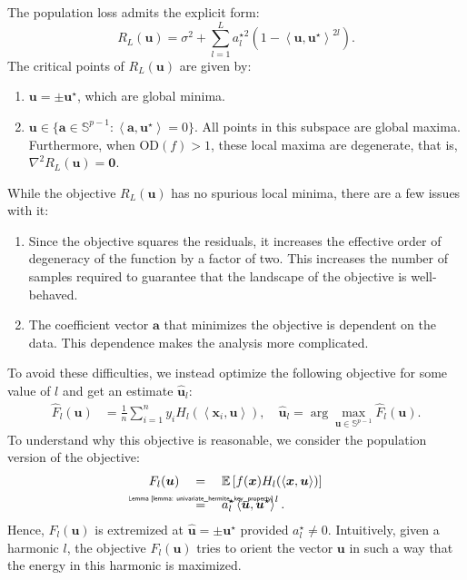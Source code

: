 \documentclass[final,12pt]{colt2018} %
\newcommand{\E}{\mathbb{E}}
\newcommand{\sd}[1]{\text{OD}(#1)}
\newcommand{\unitsphere}[1]{\mathbb{S}^{#1}}
\newcommand{\explain}[2]{\mathrel{\overset{\makebox[0pt]{\mbox{\normalfont\tiny\sffamily #1}}}{#2}}}
\renewcommand\v[1]{{\ensuremath{\boldsymbol{#1}}}}
\newcommand\ip[1]{\left\langle #1 \right\rangle}
\begin{document}
\begin{theorem}
\label{theorem: landscape_population_loss} The population loss admits the explicit form: 
$$R_L(\v u)  = \sigma^2 + \sum_{l=1}^L {a_l^\star}^2 (1-\ip{\v u, \v u^\star}^{2l}). $$
The critical points of $ R_L(\v u)$ are given by:
\begin{enumerate}
    \item $\v u = \pm \v u^\star$, which are global minima.
    \item $\v u \in \{ \v a \in \unitsphere{p-1}: \ip{\v a, \v u^\star} = 0\}$. All points in this subspace are global maxima. Furthermore, when $\sd{f}>1$, these local maxima are degenerate, that is, $\nabla^2 R_L(\v u) = \v 0$.
\end{enumerate}
\end{theorem}



While the objective $R_L(\v u)$ has no spurious local minima, there are a few issues with it:
\begin{enumerate}
    \item Since the objective squares the residuals, it increases the effective order of degeneracy of the function by a factor of two. This increases the number of samples required to guarantee that the landscape of the objective is well-behaved. 
    \item The coefficient vector $\v a$ that minimizes the  objective is dependent on the data. This dependence makes the analysis more complicated. 
\end{enumerate}

To avoid these difficulties, we instead optimize the following objective for some value of $l$ and get an estimate $\hat{\v u}_l$:
\begin{align*}
    \hat{F}_{l}(\v u) &= \frac{1}{n} \sum_{i=1}^n y_i H_l(\ip{\v x_i, \v u}) , \quad
    \hat{\v u}_l = \arg \max_{\v u \in \unitsphere{p-1}} \hat{F}_l(\v u).
\end{align*}
To understand why this objective is reasonable, we consider the population version of the objective: 
\begin{align*}
    F_l(\v u)  %
      &\quad = \quad  \E \left[f(\v x) H_l(\ip{\v x, \v u}) \right] \\
      & \quad \explain{Lemma~\ref{lemma: univariate_hermite_key_property}}{=} \quad   a_l^\star \ip{\v u, \v u^\star}^l.
\end{align*}
Hence, $F_l(\v u)$ is extremized at $\hat{\v u} = \pm \v u^\star$ provided $a_l^\star \neq 0$. Intuitively, given a harmonic $l$, the objective $F_l(\v u)$ tries to orient the vector $\v u$ in such a way that the energy in this harmonic is maximized. 
\end{document}
